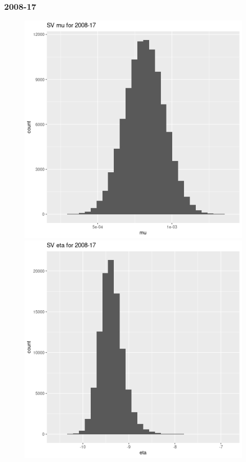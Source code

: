 \documentclass[12pt,letterpaper,reqno,fleqn]{article}
\begin{document}
\subsubsection{2008-17}
\begin{figure}
\includegraphics[scale = .4]{svmu0817}
\includegraphics[scale = .4]{sve0817}

\end{figure}
\end{document}
